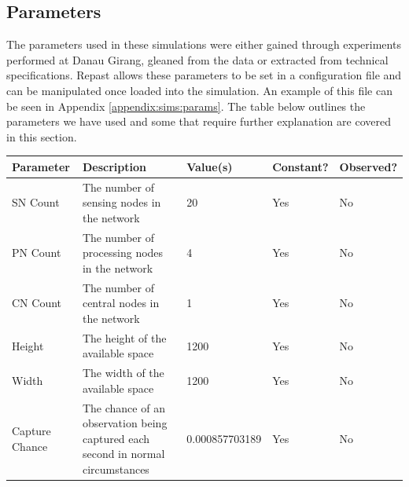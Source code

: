 \subsection{Parameters}
The parameters used in these simulations were either gained through experiments performed at Danau Girang, gleaned from the data or extracted from technical specifications. Repast allows these parameters to be set in a configuration file and can be manipulated once loaded into the simulation. An example of this file can be seen in Appendix \ref{appendix:sims:params}. The table below outlines the parameters we have used and some that require further explanation are covered in this section.
	\begin{landscape}
	\begin{table} 
	\begin{tabularx}{\textwidth}{|p{4cm}|p{10cm}|p{3cm}|p{2cm}|p{2cm}|}
\toprule
	\textbf{Parameter}                      & \textbf{Description}                                                                                                        & \textbf{Value(s)}   & \textbf{Constant?} & \textbf{Observed?} \\
\midrule
	SN Count                      & The number of sensing nodes in the network                                                                                  & 20                  & Yes                & No                 \\
	PN Count                      & The number of processing nodes in the network                                                                                  & 4                   & Yes                & No                 \\
	CN Count                      & The number of central nodes in the network                                                                                  & 1                   & Yes                & No                 \\
	Height                                  & The height of the available space                                                                                           & 1200                & Yes                & No                 \\
	Width                                   & The width of the available space                                                                                            & 1200                & Yes                & No                 \\
	Capture Chance                          & The chance of an observation being captured each second in normal circumstances                                             & 0.000857703189      & Yes                & No                 \\

\end{tabularx}
\end{table}
\end{landscape}
